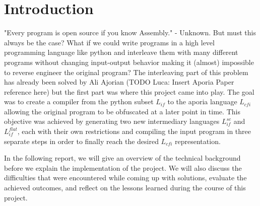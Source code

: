 \section{Introduction}

"Every program is open source if you know Assembly." - Unknown. But must this always be the case? What if we could write programs in a high level programming language like python and
interleave them with many different programs without changing input-output behavior making it (almost) impossible to reverse engineer the original program? The interleaving part of this problem has already been 
solved by Ali Ajorian (TODO Luca: Insert Aporia Paper reference here) but the first part was where this project came into play.
The goal was to create a compiler from the python subset $L_{if}$ to the aporia language $L_{cfi}$ allowing the original program to be obfuscated at a later point in time.
This objective was achieved by generating two new intermediary languages $L_{if}^{sc}$ and $L_{if}^{flat}$, each with their own restrictions and compiling the input program 
in three separate steps in order to finally reach the desired $L_{cfi}$ representation.

In the following report, we will give an overview of the technical background before we explain the implementation of the project. We will also discuss the difficulties that were 
encountered while coming up with solutions, evaluate the achieved outcomes, and reflect on the lessons learned during the course of this project.
